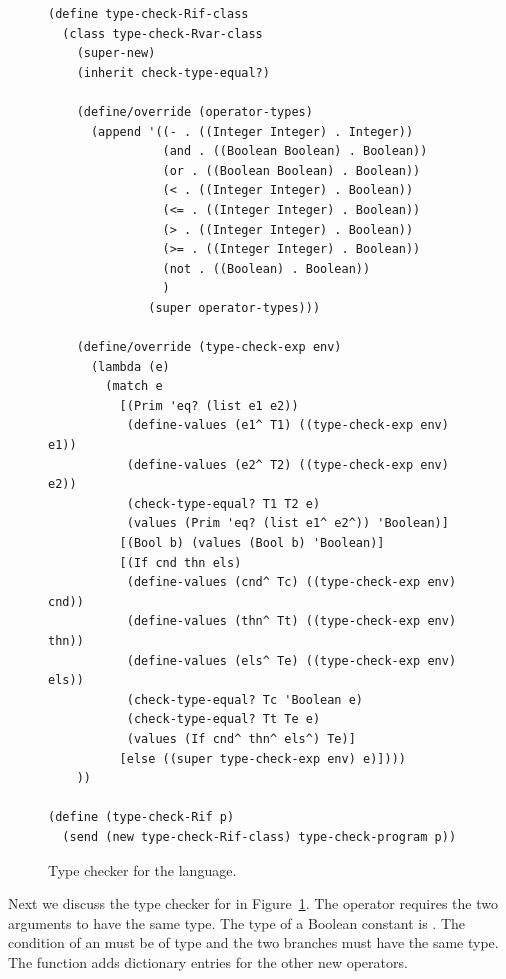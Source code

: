 \documentclass[11pt]{book}
\begin{document}
\begin{figure}[tbp]
\begin{lstlisting}[basicstyle=\ttfamily\footnotesize]
(define type-check-Rif-class
  (class type-check-Rvar-class
    (super-new)
    (inherit check-type-equal?)
    
    (define/override (operator-types)
      (append '((- . ((Integer Integer) . Integer))
                (and . ((Boolean Boolean) . Boolean))
                (or . ((Boolean Boolean) . Boolean))
                (< . ((Integer Integer) . Boolean))
                (<= . ((Integer Integer) . Boolean))
                (> . ((Integer Integer) . Boolean))
                (>= . ((Integer Integer) . Boolean))
                (not . ((Boolean) . Boolean))
                )
              (super operator-types)))

    (define/override (type-check-exp env)
      (lambda (e)
        (match e
          [(Prim 'eq? (list e1 e2))
           (define-values (e1^ T1) ((type-check-exp env) e1))
           (define-values (e2^ T2) ((type-check-exp env) e2))
           (check-type-equal? T1 T2 e)
           (values (Prim 'eq? (list e1^ e2^)) 'Boolean)]
          [(Bool b) (values (Bool b) 'Boolean)]
          [(If cnd thn els)
           (define-values (cnd^ Tc) ((type-check-exp env) cnd))
           (define-values (thn^ Tt) ((type-check-exp env) thn))
           (define-values (els^ Te) ((type-check-exp env) els))
           (check-type-equal? Tc 'Boolean e)
           (check-type-equal? Tt Te e)
           (values (If cnd^ thn^ els^) Te)]
          [else ((super type-check-exp env) e)])))
    ))

(define (type-check-Rif p)
  (send (new type-check-Rif-class) type-check-program p))
\end{lstlisting}
\caption{Type checker for the \LangIf{} language.}
\label{fig:type-check-Rif}
\end{figure}

Next we discuss the type checker for \LangIf{} in
Figure~\ref{fig:type-check-Rif}.  The operator  requires the
two arguments to have the same type. The type of a Boolean constant is
. The condition of an  must be of
 type and the two branches must have the same type.  The
 function adds dictionary entries for the other
new operators.
\end{document}
